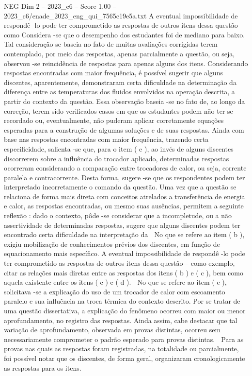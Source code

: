 \begin{textsample}{NEG Dim 2 – 2023\_c6 – Score 1.00 – 2023\_c6/enade\_2023\_eng\_qui\_7565c19e5a.txt}
A eventual impossibilidade de respondê -lo pode ter comprometido as respostas de outros itens dessa questão – como Considera -se que o desempenho dos estudantes foi de mediano para baixo.
Tal consideração se baseia no fato de muitas avaliações corrigidas terem contemplado, por meio das respostas, apenas parcialmente a questão, ou seja, observou -se reincidência de respostas para apenas alguns dos itens.
Considerando respostas encontradas com maior frequência, é possível sugerir que alguns discentes, aparentemente, demonstraram certa dificuldade na determinação da diferença entre as temperaturas dos fluidos envolvidos na operação descrita, a partir do contexto da questão.
Essa observação baseia -se no fato de, ao longo da correção, terem sido verificados casos em que os estudantes podem não ter se recordado ou, eventualmente, não puderam aplicar corretamente equações esperadas para a construção de algumas soluções e de suas respostas.
Ainda com base nas respostas encontradas com maior frequência, trazendo certa especificidade, salienta -se que, para o item ( e ), ao invés de alguns discentes discorrerem sobre a influência do trocador aplicado, determinadas respostas ocorreram considerando a comparação entre trocadores de calor, ou seja, corrente paralela e contracorrente.
Desta forma, sugere -se que os respondentes podem ter interpretado incorretamente o comando da questão.
Uma vez que a questão se relaciona de forma mais direta com conceitos atrelados a transferência de energia e calor, as respostas encontradas, ou mesmo suas ausências, permitem a seguinte reflexão : dado o contexto, pôde -se considerar que a incompletude, ou a não assertividade de determinadas respostas, sugere que alguns discentes podem ter encontrado certa dificuldade na interpretação da  No que se refere ao item ( b ), exigiu mobilização de conhecimentos prévios dos discentes, em função de equacionamento mais específico.
A eventual impossibilidade de respondê -lo pode ter comprometido as respostas de outros itens dessa questão – como exemplo, citar as relações mais diretas entre as respostas dos itens ( b ) e ( c ), bem como aquela existente entre os itens ( c ) e ( d ).  No que se refere ao item ( e ), solicitava -se a explicação do uso de um trocador de calor com escoamento paralelo e sua influência na troca térmica do contexto descrito.
Por se tratar de uma questão dissertativa, a explicação do fenômeno ocorreu com maior ou menor aprofundamento, no registro das respostas.
Ainda assim, cabe destacar que tal variação de aprofundamento, observada em provas distintas, ocorreu sem necessariamente comprometer o padrão esperado para provas distintas.  Para as provas nas quais as respostas foram registradas, na totalidade ou parcialmente, foi possível notar que os discentes, de forma geral, organizaram cronologicamente as respostas para os itens.

\end{textsample}
